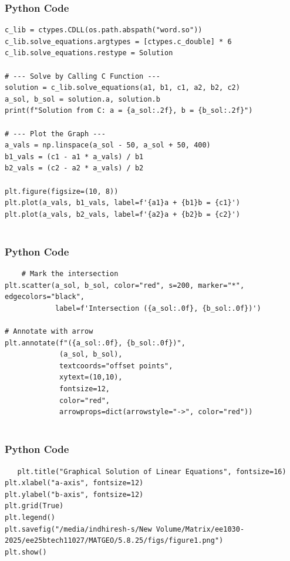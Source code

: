 \documentclass{beamer}
\begin{document}
    \begin{frame}[fragile]
        \frametitle{Python Code}
        \begin{lstlisting}
c_lib = ctypes.CDLL(os.path.abspath("word.so"))
c_lib.solve_equations.argtypes = [ctypes.c_double] * 6
c_lib.solve_equations.restype = Solution

# --- Solve by Calling C Function ---
solution = c_lib.solve_equations(a1, b1, c1, a2, b2, c2)
a_sol, b_sol = solution.a, solution.b
print(f"Solution from C: a = {a_sol:.2f}, b = {b_sol:.2f}")

# --- Plot the Graph ---
a_vals = np.linspace(a_sol - 50, a_sol + 50, 400)
b1_vals = (c1 - a1 * a_vals) / b1
b2_vals = (c2 - a2 * a_vals) / b2

plt.figure(figsize=(10, 8))
plt.plot(a_vals, b1_vals, label=f'{a1}a + {b1}b = {c1}')
plt.plot(a_vals, b2_vals, label=f'{a2}a + {b2}b = {c2}')


        \end{lstlisting}
    \end{frame}
    
    \begin{frame}[fragile]
        \frametitle{Python Code}
        \begin{lstlisting}
    # Mark the intersection
plt.scatter(a_sol, b_sol, color="red", s=200, marker="*", edgecolors="black",
            label=f'Intersection ({a_sol:.0f}, {b_sol:.0f})')

# Annotate with arrow
plt.annotate(f"({a_sol:.0f}, {b_sol:.0f})",
             (a_sol, b_sol),
             textcoords="offset points",
             xytext=(10,10),
             fontsize=12,
             color="red",
             arrowprops=dict(arrowstyle="->", color="red"))


        \end{lstlisting}
    \end{frame}
    
    \begin{frame}[fragile]
        \frametitle{Python Code}
        \begin{lstlisting}
   plt.title("Graphical Solution of Linear Equations", fontsize=16)
plt.xlabel("a-axis", fontsize=12)
plt.ylabel("b-axis", fontsize=12)
plt.grid(True)
plt.legend()
plt.savefig("/media/indhiresh-s/New Volume/Matrix/ee1030-2025/ee25btech11027/MATGEO/5.8.25/figs/figure1.png")
plt.show()
        \end{lstlisting}
    \end{frame}
    
\end{document}
